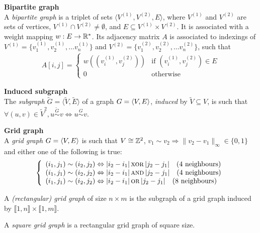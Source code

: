 \begin{definition}\textbf{Bipartite graph}\\
A \emph{bipartite graph} is a triplet of sets $\langle V^{(1)}, V^{(2)}, E \rangle$, where $V^{(1)}$ and $V^{(2)}$ are sets of vertices, $V^{(1)} \cap V^{(2)} \neq \emptyset$, and $E \subseteq V^{(1)} \times V^{(2)}$. It is associated with a weight mapping $w: E \rightarrow \mathbb{R}^*$. Its adjacency matrix $A$ is associated to indexings of $V^{(1)} = \{v^{(1)}_1, v^{(1)}_2, \ldots v^{(1)}_n\}$ and $V^{(2)} = \{v^{(2)}_1, v^{(2)}_2, \ldots v^{(2)}_n\}$, such that
\begin{gather*}
A[i,j] =
 \begin{cases}
   w\left((v^{(1)}_i,v^{(2)}_j)\right) & \text{if } (v^{(1)}_i,v^{(2)}_j) \in E \\
   0 & \text{otherwise}
 \end{cases}
\end{gather*}
\end{definition}

\begin{definition}\textbf{Induced subgraph}\\
The \emph{subgraph} $\widetilde{G} = \langle \widetilde{V},\widetilde{E} \rangle$ of a graph $G = \langle V, E \rangle$, \emph{induced} by $\widetilde{V} \subseteq V$, is such that $\forall (u,v) \in \widetilde{V}^2, u \overset{\widetilde{G}}{\sim} v \Leftrightarrow u \overset{G}{\sim} v$.
\end{definition}

\begin{definition}\textbf{Grid graph}\\
A \emph{grid graph} $G = \langle V, E \rangle$ is 
such that $V \cong \mathbb{Z}^2$, $v_1 \sim v_2 \Rightarrow \|v_2 -v_1\|_\infty \in \{0, 1\}$ and either one of the following is true:
\begin{gather*}
\left\{
  \begin{array}{l}
    (i_1,j_1) \sim (i_2,j_2) \Leftrightarrow |i_2 - i_1| \operatorname{\textsc{xor}} |j_2 - j_1| \quad \text{($4$ neighbours)}\\
    (i_1,j_1) \sim (i_2,j_2) \Leftrightarrow |i_2 - i_1| \operatorname{\textsc{and}} |j_2 - j_1| \quad \text{($4$ neighbours)}\\
    (i_1,j_1) \sim (i_2,j_2) \Leftrightarrow |i_2 - i_1| \operatorname{\textsc{or}} |j_2 - j_1| \quad \text{($8$ neighbours)}
  \end{array}
\right.
\end{gather*}

A \emph{(rectangular) grid graph} of size $n \times m$ is the subgraph of a grid graph induced by $\llbracket 1, n \rrbracket \times \llbracket 1, m \rrbracket$.

A \emph{square grid graph} is a rectangular grid graph of square size.
\end{definition}

